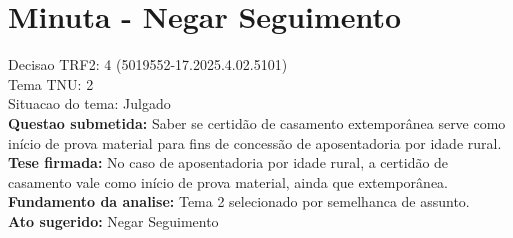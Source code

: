 \documentclass{article}
\begin{document}
\section*{Minuta - Negar Seguimento}
Decisao TRF2: 4 (5019552-17.2025.4.02.5101)\\
Tema TNU: 2\\
Situacao do tema: Julgado\\
\textbf{Questao submetida:} Saber se certidão de casamento extemporânea serve como início de prova material para fins de concessão de aposentadoria por idade rural.\\
\textbf{Tese firmada:} No caso de aposentadoria por idade rural, a certidão de casamento vale como início de prova material, ainda que extemporânea.\\
\textbf{Fundamento da analise:} Tema 2 selecionado por semelhanca de assunto.\\
\textbf{Ato sugerido:} Negar Seguimento
\end{document}
